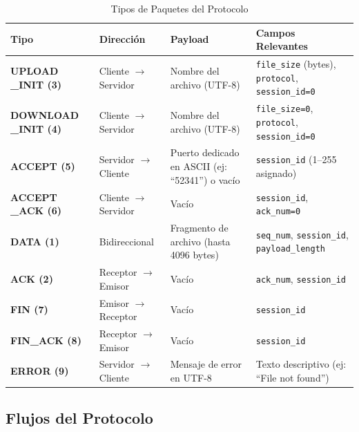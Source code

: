 \begin{table}[H]

\label{tab:packet_types}
\renewcommand{\arraystretch}{2}
\begin{tabularx}{\textwidth}{|>{\centering\arraybackslash}m{3cm}|p{3cm}|X|X|}
\hline
\textbf{Tipo} & \textbf{Dirección} & \textbf{Payload} & \textbf{Campos Relevantes} \\ \hline

\textbf{UPLOAD
\_INIT (3)}
& Cliente $\rightarrow$ Servidor
& Nombre del archivo (UTF-8)
& \texttt{file\_size} (bytes), \texttt{protocol}, \texttt{session\_id=0} \\ \hline

\textbf{DOWNLOAD
\_INIT (4)}
& Cliente $\rightarrow$ Servidor
& Nombre del archivo (UTF-8)
& \texttt{file\_size=0}, \texttt{protocol}, \texttt{session\_id=0} \\ \hline

\textbf{ACCEPT (5)}
& Servidor $\rightarrow$ Cliente
& Puerto dedicado en ASCII (ej: ``52341'') o vacío
& \texttt{session\_id} (1–255 asignado) \\ \hline

\textbf{ACCEPT
\_ACK (6)}
& Cliente $\rightarrow$ Servidor
& Vacío
& \texttt{session\_id}, \texttt{ack\_num=0} \\ \hline

\textbf{DATA (1)}
& Bidireccional
& Fragmento de archivo (hasta 4096 bytes)
& \texttt{seq\_num}, \texttt{session\_id}, \texttt{payload\_length} \\ \hline

\textbf{ACK (2)}
& Receptor $\rightarrow$ Emisor
& Vacío
& \texttt{ack\_num}, \texttt{session\_id} \\ \hline

\textbf{FIN (7)}
& Emisor $\rightarrow$ Receptor
& Vacío
& \texttt{session\_id} \\ \hline

\textbf{FIN\_ACK (8)}
& Receptor $\rightarrow$ Emisor
& Vacío
& \texttt{session\_id} \\ \hline

\textbf{ERROR (9)}
& Servidor $\rightarrow$ Cliente
& Mensaje de error en UTF-8
& Texto descriptivo (ej: ``File not found'') \\ \hline

\end{tabularx}
\centering
\caption{Tipos de Paquetes del Protocolo}
\end{table}

\subsection{Flujos del Protocolo}

